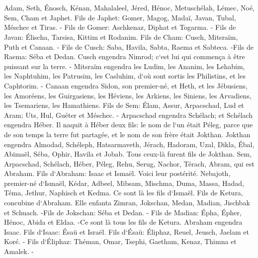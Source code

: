 

\chapter{}

\verse Adam, Seth, Énosch, 
\verse Kénan, Mahalaleel, Jéred, 
\verse Hénoc, Metuschélah, Lémec, 
\verse Noé, Sem, Cham et Japhet. 
\verse Fils de Japhet: Gomer, Magog, Madaï, Javan, Tubal, Méschec et Tiras. - 
\verse Fils de Gomer: Aschkenaz, Diphat et Togarma. - 
\verse Fils de Javan: Élischa, Tarsisa, Kittim et Rodanim. 
\verse Fils de Cham: Cusch, Mitsraïm, Puth et Canaan. - 
\verse Fils de Cusch: Saba, Havila, Sabta, Raema et Sabteca. -Fils de Raema: Séba et Dedan. 
\verse Cusch engendra Nimrod; c`est lui qui commença à être puissant sur la terre. - 
\verse Mitsraïm engendra les Ludim, les Ananim, les Lehabim, les Naphtuhim, 
\verse les Patrusim, les Casluhim, d`où sont sortis les Philistins, et les Caphtorim. - 
\verse Canaan engendra Sidon, son premier-né, et Heth, 
\verse et les Jébusiens, les Amoréens, les Guirgasiens, 
\verse les Héviens, les Arkiens, les Siniens, 
\verse les Arvadiens, les Tsemariens, les Hamathiens. 
\verse Fils de Sem: Élam, Assur, Arpacschad, Lud et Aram; Uts, Hul, Guéter et Méschec. - 
\verse Arpacschad engendra Schélach; et Schélach engendra Héber. 
\verse Il naquit à Héber deux fils: le nom de l`un était Péleg, parce que de son temps la terre fut partagée, et le nom de son frère était Jokthan. 
\verse Jokthan engendra Almodad, Schéleph, Hatsarmaveth, Jérach, 
\verse Hadoram, Uzal, Dikla, 
\verse Ébal, Abimaël, Séba, Ophir, Havila et Jobab. 
\verse Tous ceux-là furent fils de Jokthan. 
\verse Sem, Arpacschad, Schélach, 
\verse Héber, Péleg, Rehu, 
\verse Serug, Nachor, Térach, 
\verse Abram, qui est Abraham. 
\verse Fils d`Abraham: Isaac et Ismaël. 
\verse Voici leur postérité. Nebajoth, premier-né d`Ismaël, Kédar, Adbeel, Mibsam, 
\verse Mischma, Duma, Massa, Hadad, Téma, 
\verse Jethur, Naphisch et Kedma. Ce sont là les fils d`Ismaël. 
\verse Fils de Ketura, concubine d`Abraham. Elle enfanta Zimran, Jokschan, Medan, Madian, Jischbak et Schuach. -Fils de Jokschan: Séba et Dedan. - 
\verse Fils de Madian: Épha, Épher, Hénoc, Abida et Eldaa. -Ce sont là tous les fils de Ketura. 
\verse Abraham engendra Isaac. Fils d`Isaac: Ésaü et Israël. 
\verse Fils d`Ésaü: Éliphaz, Reuel, Jeusch, Jaelam et Koré. - 
\verse Fils d`Éliphaz: Théman, Omar, Tsephi, Gaetham, Kenaz, Thimna et Amalek. - 
